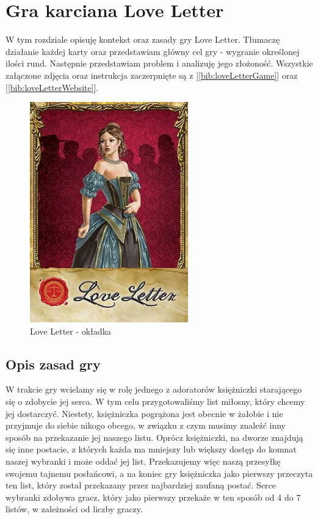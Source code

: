 \chapter{Gra karciana Love Letter}
\label{cha:rozdz2}

W tym rozdziale opisuję kontekst oraz zasady gry Love Letter. Tłumaczę działanie każdej karty oraz przedstawiam główny cel gry - wygranie określonej ilości rund. Następnie przedstawiam problem i analizuję jego złożoność. Wszystkie załączone zdjęcia oraz instrukcja zaczerpnięte są z [\ref{bib:loveLetterGame}] oraz [\ref{bib:loveLetterWebsite}].

\begin{figure}[h]
	\centering
	\includegraphics{Resources/ll_main_image.png}
	\caption{Love Letter - okładka} 
	\label{fig:llMainImage}
\end{figure}

\section{Opis zasad gry}
\label{sec:opisGry}
W trakcie gry wcielamy się w rolę jednego z adoratorów księżniczki starającego się o zdobycie jej serca. W tym celu przygotowaliśmy list miłosny, który chcemy jej dostarczyć. Niestety, księżniczka pogrążona jest obecnie w żałobie i nie przyjmuje do siebie nikogo obcego, w związku z czym musimy znaleźć inny sposób na przekazanie jej naszego listu. Oprócz księżniczki, na dworze znajdują się inne postacie, z których każda ma mniejszy lub większy dostęp do komnat naszej wybranki i może oddać jej list. Przekazujemy więc naszą przesyłkę swojemu tajnemu posłańcowi, a na koniec gry księżniczka jako pierwszy przeczyta ten list, który został przekazany przez najbardziej zaufaną postać. Serce wybranki zdobywa gracz, który jako pierwszy przekaże w ten sposób od 4 do 7 listów, w zależności od liczby graczy.

